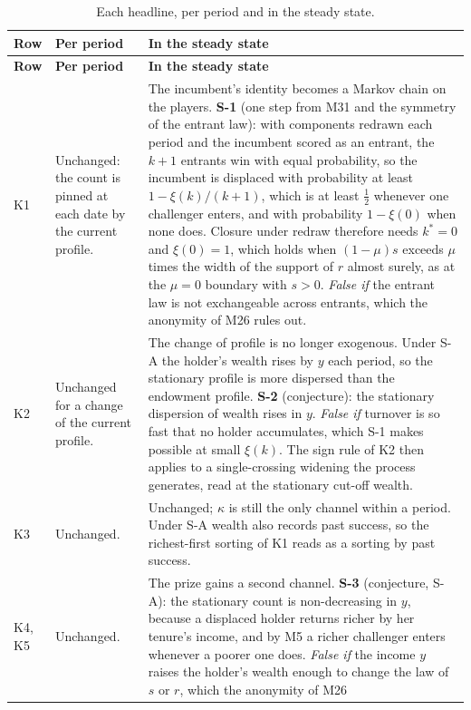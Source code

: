 \documentclass[11pt]{article}
\begin{document}
\footnotesize
\begin{longtable}{@{}P{1.6cm}P{5.2cm}P{8.4cm}@{}}
\caption{Each headline, per period and in the steady state.}\\
\toprule
\textbf{Row} & \textbf{Per period} & \textbf{In the steady state} \\
\midrule
\endfirsthead
\toprule
\textbf{Row} & \textbf{Per period} & \textbf{In the steady state} \\
\midrule
\endhead
\bottomrule
\endfoot
K1 & Unchanged: the count is pinned at each date by the current profile. & The
  incumbent's identity becomes a Markov chain on the players. \textbf{S-1}
  (one step from M31 and the symmetry of the entrant law): with components
  redrawn each period and the incumbent scored as an entrant, the $k+1$
  entrants win with equal probability, so the incumbent is displaced with
  probability at least $1-\xi(k)/(k+1)$, which is at least $\tfrac12$ whenever
  one challenger enters, and with probability $1-\xi(0)$ when none does.
  Closure under redraw therefore needs $k^*=0$ and $\xi(0)=1$, which holds
  when $(1-\mu)s$ exceeds $\mu$ times the width of the support of $r$ almost
  surely, as at the $\mu=0$ boundary with $s>0$.
  \emph{False if} the entrant law is not exchangeable across entrants, which
  the anonymity of M26 rules out. \\ \addlinespace
K2 & Unchanged for a change of the current profile. & The change of profile is
  no longer exogenous. Under S-A the holder's wealth rises by $y$ each period, so the
  stationary profile is more dispersed than the endowment profile.
  \textbf{S-2} (conjecture): the stationary dispersion of wealth rises in $y$.
  \emph{False if} turnover is so fast that no holder accumulates, which S-1
  makes possible at small $\xi(k)$. The sign rule of K2 then applies to a
  single-crossing widening the process generates, read at the stationary
  cut-off wealth. \\
  \addlinespace
K3 & Unchanged. & Unchanged; $\kappa$ is still the only channel within a
  period. Under S-A wealth also records past success, so the richest-first
  sorting of K1 reads as a sorting by past success. \\ \addlinespace
K4, K5 & Unchanged. & The prize gains a second channel. \textbf{S-3}
  (conjecture, S-A): the stationary count is non-decreasing in $y$, because a
  displaced holder returns richer by her tenure's income, and by M5 a richer
  challenger enters whenever a poorer one does. \emph{False if} the income $y$ raises the holder's
  wealth enough to change the law of $s$ or $r$, which the anonymity of M26

\end{longtable}
\end{document}

